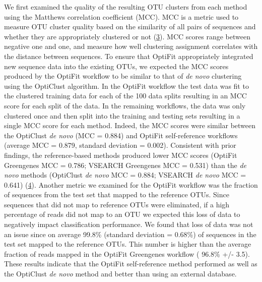 \documentclass[
]{article}
\begin{document}
We first examined the quality of the resulting OTU clusters from each
method using the Matthews correlation coefficient (MCC). MCC is a metric
used to measure OTU cluster quality based on the similarity of all pairs
of sequences and whether they are appropriately clustered or not
(\protect\hyperlink{ref-westcott2015}{3}). MCC scores range between
negative one and one, and measure how well clustering assignment
correlates with the distance between sequences. To ensure that OptiFit
appropriately integrated new sequence data into the existing OTUs, we
expected the MCC scores produced by the OptiFit workflow to be similar
to that of \emph{de novo} clustering using the OptiClust algorithm. In
the OptiFit workflow the test data was fit to the clustered training
data for each of the 100 data splits resulting in an MCC score for each
split of the data. In the remaining workflows, the data was only
clustered once and then split into the training and testing sets
resulting in a single MCC score for each method. Indeed, the MCC scores
were similar between the OptiClust \emph{de novo} (MCC = 0.884) and
OptiFit self-reference workflows (average MCC = 0.879, standard
deviation = 0.002). Consistent with prior findings, the reference-based
methods produced lower MCC scores (OptiFit Greengenes MCC = 0.786;
VSEARCH Greengenes MCC = 0.531) than the \emph{de novo} methods
(OptiClust \emph{de novo} MCC = 0.884; VSEARCH \emph{de novo} MCC =
0.641) (\protect\hyperlink{ref-sovacool2022}{4}). Another metric we
examined for the OptiFit workflow was the fraction of sequences from the
test set that mapped to the reference OTUs. Since sequences that did not
map to reference OTUs were eliminated, if a high percentage of reads did
not map to an OTU we expected this loss of data to negatively impact
classification performance. We found that loss of data was not an issue
since on average 99.8\% (standard deviation = 0.68\%) of sequences in
the test set mapped to the reference OTUs. This number is higher than
the average fraction of reads mapped in the OptiFit Greengenes workflow
( 96.8\% +/- 3.5). These results indicate that the OptiFit
self-reference method performed as well as the OptiClust \emph{de novo}
method and better than using an external database.
\end{document}
